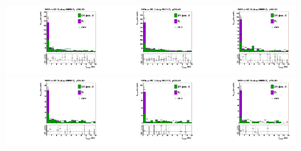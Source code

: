 \begin{figure}[htb]
\begin{center}
\includegraphics[width=0.32\textwidth]{../figs/figs_v11/MUON_ZGamma/PrepareYields/c_TotalDATAvsMC_Endcap__phoPFChIsoCorrFSR_EXCLUDED_pt30to35_.pdf}\includegraphics[width=0.32\textwidth]{../figs/figs_v11/MUON_ZGamma/PrepareYields/c_TotalDATAvsMC_Endcap__phoPFChIsoCorrFSR_EXCLUDED_pt35to45_.pdf}\includegraphics[width=0.32\textwidth]{../figs/figs_v11/MUON_ZGamma/PrepareYields/c_TotalDATAvsMC_Endcap__phoPFChIsoCorrFSR_EXCLUDED_pt45to55_.pdf}\\
\includegraphics[width=0.32\textwidth]{../figs/figs_v11/MUON_ZGamma/PrepareYields/c_TotalDATAvsMC_Endcap__phoPFChIsoCorrFSR_EXCLUDED_pt55to65_.pdf}\includegraphics[width=0.32\textwidth]{../figs/figs_v11/MUON_ZGamma/PrepareYields/c_TotalDATAvsMC_Endcap__phoPFChIsoCorrFSR_EXCLUDED_pt65to75_.pdf}\includegraphics[width=0.32\textwidth]{../figs/figs_v11/MUON_ZGamma/PrepareYields/c_TotalDATAvsMC_Endcap__phoPFChIsoCorrFSR_EXCLUDED_pt75to85_.pdf}\\

\end{center}
\end{figure}
